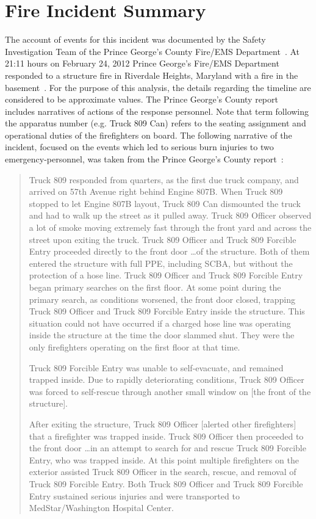 \documentclass[12pt,oneside]{book}
\begin{document}
\chapter{Fire Incident Summary}
\label{fire_sum}
The account of events for this incident was documented by the Safety Investigation Team of the Prince George's County Fire/EMS Department~\cite{PGCounty2013}. At 21:11 hours on February 24, 2012 Prince George's Fire/EMS Department responded to a structure fire in Riverdale Heights, Maryland with a fire in the basement~\cite{PGCounty2013}. For the purpose of this analysis, the details regarding the timeline are considered to be approximate values. The Prince George's County report~\cite{PGCounty2013} includes narratives of actions of the response personnel. Note that term following the apparatus number (e.g. Truck 809 Can) refers to the seating assignment and operational duties of the firefighters on board. The following narrative of the incident, focused on the events which led to serious burn injuries to two emergency-personnel, was taken from the Prince George's County report~\cite{PGCounty2013}:
\begin{quote}
Truck 809 responded from quarters, as the first due truck company, and arrived on 57th Avenue right behind Engine 807B. When Truck 809 stopped to let Engine 807B layout, Truck 809 Can dismounted the truck and had to walk up the street as it pulled away. Truck 809 Officer observed a lot of smoke moving extremely fast through the front yard and across the street upon exiting the truck. Truck 809 Officer and Truck 809 Forcible Entry proceeded directly to the front door \ldots of the structure. Both of them entered the structure with full PPE, including SCBA, but without the protection of a hose line. Truck 809 Officer and Truck 809 Forcible Entry began primary searches on the first floor. At some point during the primary search, as conditions worsened, the front door closed, trapping Truck 809 Officer and Truck 809 Forcible Entry inside the structure. This situation could not have occurred if a charged hose line was operating inside the structure at the time the door slammed shut. They were the only firefighters operating on the first floor at that time. 

Truck 809 Forcible Entry was unable to self-evacuate, and remained trapped inside. Due to rapidly deteriorating conditions, Truck 809 Officer was forced to self-rescue through another small window on [the front of the structure]. 

After exiting the structure, Truck 809 Officer [alerted other firefighters] that a firefighter was trapped inside. Truck 809 Officer then proceeded to the front door \ldots in an attempt to search for and rescue Truck 809 Forcible Entry, who was trapped inside. At this point multiple firefighters on the exterior assisted Truck 809 Officer in the search, rescue, and removal of Truck 809 Forcible Entry. Both Truck 809 Officer and Truck 809 Forcible Entry sustained serious injuries and were transported to MedStar/Washington Hospital Center. 
 
\end{quote}  
\end{document}
